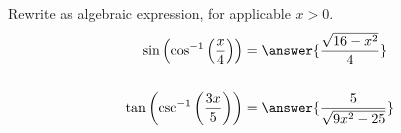 \documentclass{ximera}
\author{Bobby Ramsey}
\begin{document}
\begin{exercise}
Rewrite as algebraic expression, for applicable $x>0$.
\begin{align*}
	\sin\left( \cos^{-1}\left(\frac{x}{4}\right) \right) &= \answer{\frac{\sqrt{16-x^2}}{4}} \\ \\
	\tan\left( \csc^{-1}\left( \frac{3x}{5} \right) \right) &= \answer{\frac{5}{\sqrt{9x^2-25}}}
\end{align*}	


\end{exercise}
\end{document}
